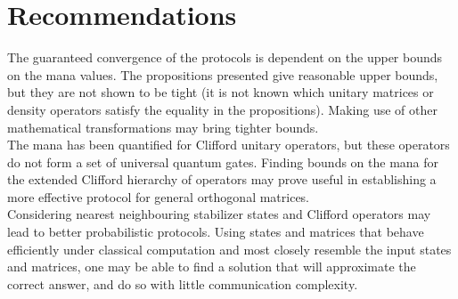 \documentclass[../3Wworkreport.tex]{subfiles}
\begin{document}
\section{Recommendations}
\label{sec:recommendations}

The guaranteed convergence of the protocols is dependent on the upper bounds on the mana values. The propositions presented give reasonable upper bounds, but they are not shown to be tight (it is not known which unitary matrices or density operators satisfy the equality in the propositions). Making use of other mathematical transformations may bring tighter bounds.\\ %

The mana has been quantified for Clifford unitary operators, but these operators do not form a set of universal quantum gates. Finding bounds on the mana for the extended Clifford hierarchy of operators may prove useful in establishing a more effective protocol for general orthogonal matrices.\\

Considering nearest neighbouring stabilizer states and Clifford operators may lead to better probabilistic protocols. Using states and matrices that behave efficiently under classical computation and most closely resemble the input states and matrices, one may be able to find a solution that will approximate the correct answer, and do so with little communication complexity.
\end{document}
